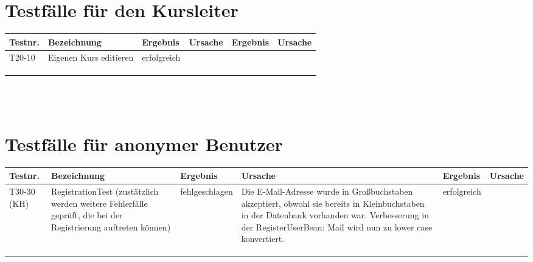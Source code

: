 \begin{landscape}
	\section{Testfälle für den Kursleiter}
		\begin{tabular}{|p{2.0cm} |p{5.0cm}|p{3.0cm}|p{5.0cm}|p{4.0cm}|p{4.0cm}|}
			\hline \textbf{Testnr.} & \textbf{Bezeichnung} & \textbf{Ergebnis} & \textbf{Ursache} & \textbf{Ergebnis} & \textbf{Ursache} \\
			\hline T20-10 & Eigenen Kurs editieren & erfolgreich &  &         &       \\
			\hline       &          &          &        &         &       \\
			\hline       &          &          &        &         &       \\
			\hline       &          &          &        &         &       \\
			\hline 
		\end{tabular} \ \\
		\ \\
				
	\section{Testfälle für anonymer Benutzer}
		\begin{tabular}{|p{2.0cm} |p{5.0cm}|p{3.0cm}|p{5.0cm}|p{4.0cm}|p{4.0cm}|}
			\hline \textbf{Testnr.} & \textbf{Bezeichnung} & \textbf{Ergebnis} & \textbf{Ursache} & \textbf{Ergebnis} & \textbf{Ursache} \\
			\hline   T30-30  (KH)  & RegistrationTest (zustätzlich werden weitere Fehlerfälle geprüft, die bei der Registrierung auftreten können)   &   fehlgeschlagen       &    Die E-Mail-Adresse wurde in Großbuchstaben akzeptiert, obwohl sie bereits in Kleinbuchstaben in der Datenbank vorhanden war. Verbesserung in der RegisterUserBean: Mail wird nun zu lower case konvertiert.    &    erfolgreich     &       \\
			\hline       &          &          &        &         &       \\
			\hline       &          &          &        &         &       \\
			\hline       &          &          &        &         &       \\
			\hline 
		\end{tabular} \ \\
		\ \\
			

\end{landscape}
